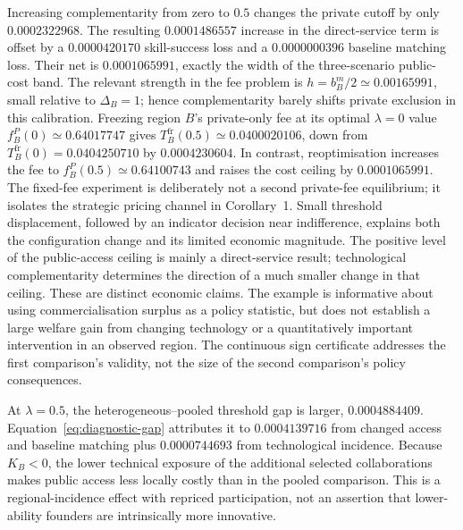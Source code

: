 Increasing complementarity from zero to $0.5$ changes the private cutoff by only $0.0002322968$.
The resulting $0.0001486557$ increase in the direct-service term is offset by a $0.0000420170$ skill-success loss and a $0.0000000396$ baseline matching loss.
Their net is $0.0001065991$, exactly the width of the three-scenario public-cost band.
The relevant strength in the fee problem is $h=b_B^m/2\simeq0.00165991$, small relative to $\Delta_B=1$; hence complementarity barely shifts private exclusion in this calibration.
Freezing region $B$'s private-only fee at its optimal $\lambda=0$ value $f_B^P(0)\simeq0.64017747$ gives $T_B^{\mathrm{fr}}(0.5)\simeq0.0400020106$, down from $T_B^{\mathrm{fr}}(0)=0.0404250710$ by $0.0004230604$. In contrast, reoptimisation increases the fee to $f_B^P(0.5)\simeq0.64100743$ and raises the cost ceiling by $0.0001065991$. The fixed-fee experiment is deliberately not a second private-fee equilibrium; it isolates the strategic pricing channel in Corollary~1.
Small threshold displacement, followed by an indicator decision near indifference, explains both the configuration change and its limited economic magnitude. The positive level of the public-access ceiling is mainly a direct-service result; technological complementarity determines the direction of a much smaller change in that ceiling. These are distinct economic claims. The example is informative about using commercialisation surplus as a policy statistic, but does not establish a large welfare gain from changing technology or a quantitatively important intervention in an observed region. The continuous sign certificate addresses the first comparison's validity, not the size of the second comparison's policy consequences.

At $\lambda=0.5$, the heterogeneous--pooled threshold gap is larger, $0.0004884409$.
Equation~\eqref{eq:diagnostic-gap} attributes it to $0.0004139716$ from changed access and baseline matching plus $0.0000744693$ from technological incidence.
Because $K_B<0$, the lower technical exposure of the additional selected collaborations makes public access less locally costly than in the pooled comparison.
This is a regional-incidence effect with repriced participation, not an assertion that lower-ability founders are intrinsically more innovative.


